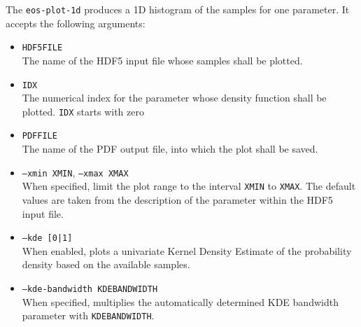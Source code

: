 The \texttt{eos-plot-1d} produces a 1D histogram of the samples for one parameter.
It accepts the following arguments:
\begin{itemize}
    \item[] \texttt{HDF5FILE}\\[\medskipamount]
        The name of the HDF5 input file whose samples shall be plotted.

    \item[] \texttt{IDX}\\[\medskipamount]
        The numerical index for the parameter whose density function shall
        be plotted. \texttt{IDX} starts with zero

    \item[] \texttt{PDFFILE}\\[\medskipamount]
        The name of the PDF output file, into which the plot shall be saved.

    \item[] \texttt{--xmin XMIN}, \texttt{--xmax XMAX}\\[\medskipamount]
        When specified, limit the plot range to the interval \texttt{XMIN} to \texttt{XMAX}.
        The default values are taken from the description of the parameter within the
        HDF5 input file.

    \item[] \texttt{--kde [0|1]}\\[\medskipamount]
        When enabled, plots a univariate Kernel Density Estimate of the probability
        density based on the available samples.

    \item[] \texttt{--kde-bandwidth KDEBANDWIDTH}\\[\medskipamount]
        When specified, multiplies the automatically determined KDE bandwidth parameter
        with \texttt{KDEBANDWIDTH}.
\end{itemize}

